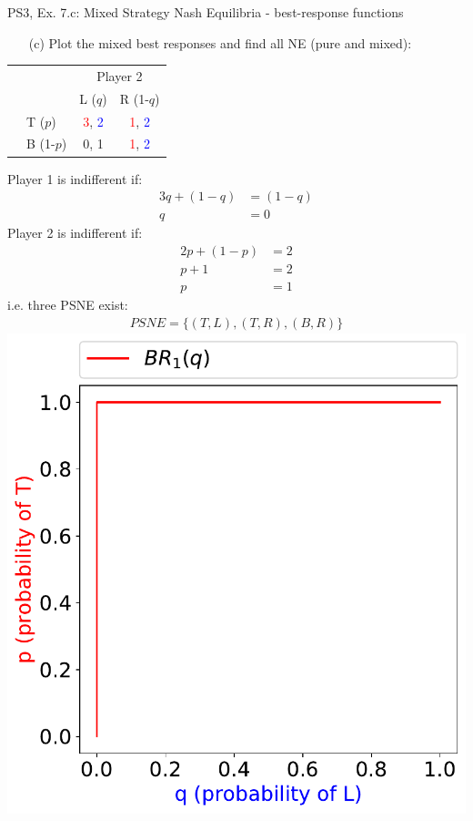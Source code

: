 \begin{frame}{PS3, Ex. 7.c: Mixed Strategy Nash Equilibria - best-response functions}
  \begin{multicols}{2}
    \begin{itemize}
      \item[(c)] Plot the mixed best responses and find all NE (pure and mixed):
    \end{itemize}
    \begin{table}
      \begin{tabular}{cl|c|c|}
        & \multicolumn{1}{c}{} & \multicolumn{2}{c}{\color{blue}Player 2}\\
        \parbox[t]{1mm}{}
        &  &  &  \\
        & T  ($p$)  & \textcolor{red}{3}, \textcolor{blue}{2} & \textcolor{red}{1}, \textcolor{blue}{2} \\
        & B  (1-$p$)& 0, 1 & \textcolor{red}{1}, \textcolor{blue}{2} \\
      \end{tabular}
    \end{table}
    Player 1 is indifferent if:
    \begin{align*}
      3q+(1-q) &= (1-q) \\
      q &= 0
    \end{align*}
    Player 2 is indifferent if:
    \begin{align*}
      2p + (1-p) &= 2 \\
      p + 1      &= 2 \\
      p          &= 1
    \end{align*}
    i.e. three PSNE exist:
    \begin{align*}
      PSNE=\{(T,L),(T,R),(B,R)\}
    \end{align*}
  \vfill\null \columnbreak
    \includegraphics[width=\columnwidth]{figures/5c1}

\end{multicols}
\end{frame}
